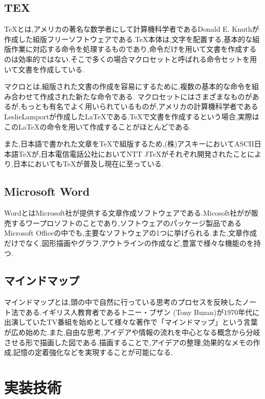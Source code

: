 \documentclass[a4j,12pt]{jarticle}
\begin{document}
\subsection{TEX}
TeXとは,アメリカの著名な数学者にして計算機科学者であるDonald E. Knuthが作成した組版フリーソフトウェアである.TeX本体は,文字を配置する,基本的な組版作業に対応する命令を処理するものであり,命令だけを用いて文書を作成するのは効率的ではない.そこで多くの場合マクロセットと呼ばれる命令セットを用いて文書を作成している.

マクロとは,組版された文書の作成を容易にするために,複数の基本的な命令を組み合わせて作成された新たな命令である.
マクロセットにはさまざまなものがあるが,もっとも有名でよく用いられているものが,アメリカの計算機科学者であるLeslieLamportが作成したLaTeXである.TeXで文書を作成するという場合,実際はこのLaTeXの命令を用いて作成することがほとんどである.

また,日本語で書かれた文章をTeXで組版するため,(株)アスキーにおいてASCII日本語TeXが,日本電信電話公社においてNTT JTeXがそれぞれ開発されたことにより,日本においてもTeXが普及し現在に至っている\cite{ren3}.

\subsection{Microsoft Word}
WordとはMicrosoft社が提供する文章作成ソフトウェアである.Micosoft社がが販売するワープロソフトのことであり,ソフトウェアのパッケージ製品であるMicrosoft Officeの中でも,主要なソフトウェアの1つに挙げられる.また,文章作成だけでなく,図形描画やグラフ,アウトラインの作成など,豊富で様々な機能のを持つ.
\newpage
\subsection{マインドマップ}
マインドマップとは,頭の中で自然に行っている思考のプロセスを反映したノート法である.イギリス人教育者であるトニー・ブザン (Tony Buzan)が1970年代に出演していたTV番組を始めとして様々な著作で「マインドマップ」という言葉が広め始めた\cite{ren4}.また,自由な思考,アイデアや情報の流れを中心となる概念から分岐させる形で描画した図である.描画することで,アイデアの整理,効果的なメモの作成,記憶の定着強化などを実現することが可能になる.%

\newpage
\section{実装技術}
\end{document}

